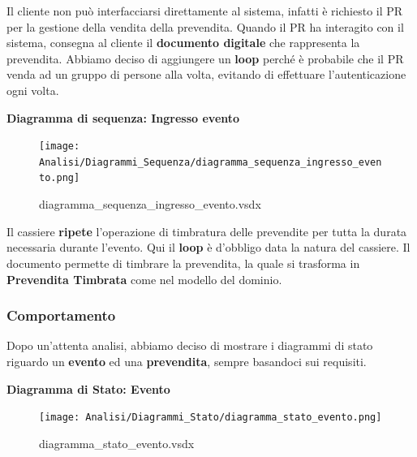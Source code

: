 \documentclass[a4paper]{article}
\begin{document}
Il cliente non può interfacciarsi direttamente al sistema, infatti è richiesto il PR per la gestione della vendita della prevendita. Quando il PR ha interagito con il sistema, consegna al cliente il \textbf{documento digitale} che rappresenta la prevendita. Abbiamo deciso di aggiungere un \textbf{loop} perché è probabile che il PR venda ad un gruppo di persone alla volta, evitando di effettuare l'autenticazione ogni volta.

\newpage

\textbf{Diagramma di sequenza: Ingresso evento}

\begin{figure}[H]
    \texttt{[image: Analisi/Diagrammi\_Sequenza/diagramma\_sequenza\_ingresso\_evento.png]}
    \centering
    \caption{diagramma\_sequenza\_ingresso\_evento.vsdx}
\end{figure}

Il cassiere \textbf{ripete} l'operazione di timbratura delle prevendite per tutta la durata necessaria durante l'evento. Qui il \textbf{loop} è d'obbligo data la natura del cassiere. Il documento permette di timbrare la prevendita, la quale si trasforma in \textbf{Prevendita Timbrata} come nel modello del dominio.

\newpage

\subsubsection{Comportamento}

Dopo un'attenta analisi, abbiamo deciso di mostrare i diagrammi di stato riguardo un \textbf{evento} ed una \textbf{prevendita}, sempre basandoci sui requisiti.



\textbf{Diagramma di Stato: Evento}

\begin{figure}[H]
    \texttt{[image: Analisi/Diagrammi\_Stato/diagramma\_stato\_evento.png]}
    \centering
    \caption{diagramma\_stato\_evento.vsdx}
\end{figure}
\end{document}
